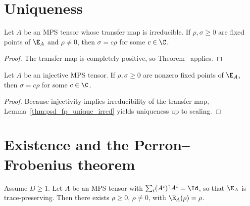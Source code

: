 \section{Uniqueness}


\begin{lemma}
    \label{thm:psd_fp_unique_irred}
    \leanok
    Let $A$ be an MPS tensor whose transfer map is irreducible. If
    $\rho,\sigma\geq0$ are fixed points of $\E_A$ and $\rho\neq0$, then
    $\sigma=c\rho$ for some $c\in\C$.
\end{lemma}

\begin{proof}\leanok
    The transfer map is completely positive, so
    Theorem~\cite[``Irreducible fixed-point uniqueness --- CP version'']{QICLean2026Blueprint} applies.
\end{proof}

\begin{lemma}
    \label{thm:psd_fp_unique}
    \leanok
    Let $A$ be an injective MPS tensor. If $\rho,\sigma\geq0$ are nonzero
    fixed points of $\E_A$, then $\sigma=c\rho$ for some $c\in\C$.
\end{lemma}

\begin{proof}\leanok
    Because injectivity implies irreducibility of the transfer map,
    Lemma~\ref{thm:psd_fp_unique_irred} yields uniqueness up to scaling.
\end{proof}


\section{Existence and the Perron--Frobenius theorem}

\begin{lemma}\label{thm:psd_fp_exists}
    \leanok
    Assume $D \ge 1$. Let $A$ be an MPS tensor with
    $\sum_i (A^i)^\dagger A^i = \Id$, so that $\E_A$ is
    trace-preserving.
    Then there exists $\rho \ge 0$, $\rho \neq 0$,
    with $\E_A(\rho) = \rho$.
\end{lemma}

